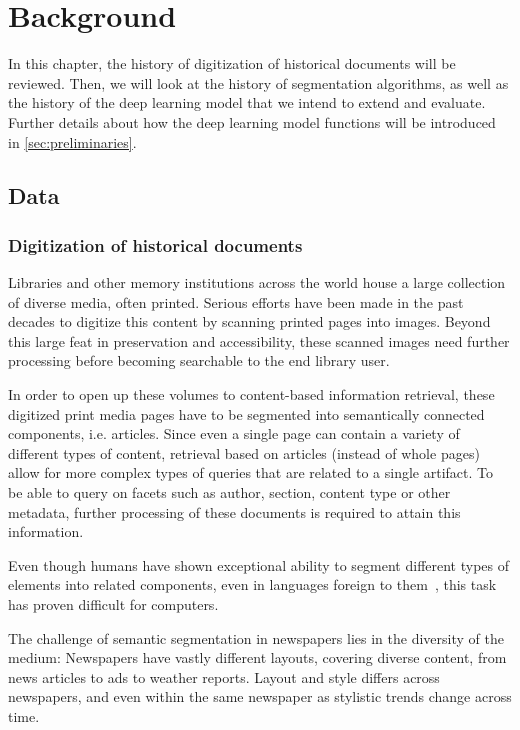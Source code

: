\documentclass[english, bibtex]{kththesis}
\begin{document}
\cleardoublepage
\chapter{Background}
\label{ch:background}

In this chapter, the history of digitization of historical documents will be reviewed. Then, we will look at the history of segmentation algorithms, as well as the history of the deep learning model that we intend to extend and evaluate. Further details about how the deep learning model functions will be introduced in \autoref{sec:preliminaries}. 

\section{Data}

\subsection{Digitization of historical documents}

Libraries and other memory institutions across the world house a large collection of diverse media, often printed. Serious efforts have been made in the past decades to digitize this content by scanning printed pages into images. Beyond this large feat in preservation and accessibility, these scanned images need further processing before becoming searchable to the end library user. 

In order to open up these volumes to content-based information retrieval, these digitized print media pages have to be segmented into semantically connected components, i.e. articles. Since even a single page can contain a variety of different types of content, retrieval based on articles (instead of whole pages) allow for more complex types of queries that are related to a single artifact. To be able to query on facets such as author, section, content type or other metadata, further processing of these documents is required to attain this information.  

Even though humans have shown exceptional ability to segment different types of elements into related components, even in languages foreign to them~\cite{8270006}, this task has proven difficult for computers. 

The challenge of semantic segmentation in newspapers lies in the diversity of the medium: Newspapers have vastly different layouts, covering diverse content, from news articles to ads to weather reports. Layout and style differs across newspapers, and even within the same newspaper as stylistic trends change across time. 
\end{document}
